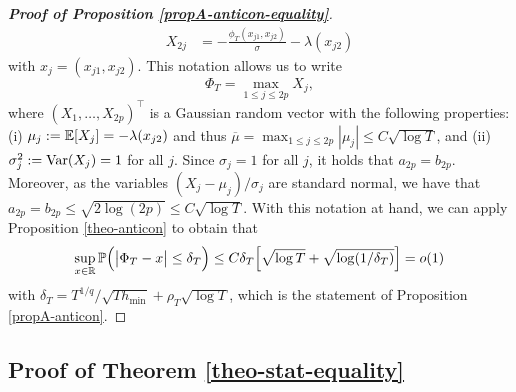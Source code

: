 \documentclass[a4paper,12pt]{article}
\begin{document}
{\begin{proof}[\textnormal{\textbf{Proof of Proposition \ref{propA-anticon-equality}}}]
\begin{align*}
X_{2j} & = -\frac{\phi_T(x_{j1},x_{j2})}{\sigma} - \lambda(x_{j2}) 
\end{align*}
with $x_j = (x_{j1},x_{j2})$. This notation allows us to write
\[ \Phi_T = \max_{1 \le j \le 2p} X_j, \]
where $(X_1,\ldots,X_{2p})^\top$ is a Gaussian random vector with the following properties: (i) $\mu_j := \mathbb{E}[X_j] = - \lambda(x_{j2})$ and thus $\overline{\mu} = \max_{1 \le j \le 2p} |\mu_j| \le C \sqrt{\log T}$, and (ii) $\sigma_j^2 := \textnormal{Var}(X_j) = 1$ for all $j$. Since $\sigma_j = 1$ for all $j$, it holds that $a_{2p} = b_{2p}$. Moreover, as the variables $(X_j - \mu_j)/\sigma_j$ are standard normal, we have that $a_{2p} = b_{2p} \le \sqrt{2 \log (2p)} \le C \sqrt{\log T}$. With this notation at hand, we can apply Proposition \ref{theo-anticon} to obtain that 
\[ \sup_{x \in \mathbb{R}} \mathbb{P} \Big( \big| \Phi_T - x \big| \le \delta_T \Big) \le C \delta_T \Big[ \sqrt{\log T} + \sqrt{ \log(1/\delta_T) } \Big] = o(1) \]
with $\delta_T = T^{1/q} / \sqrt{T h_{\min}} + \rho_T \sqrt{\log T}$, which is the statement of Proposition \ref{propA-anticon}.
\end{proof}}



\subsection*{Proof of Theorem \ref{theo-stat-equality}}
\end{document}
